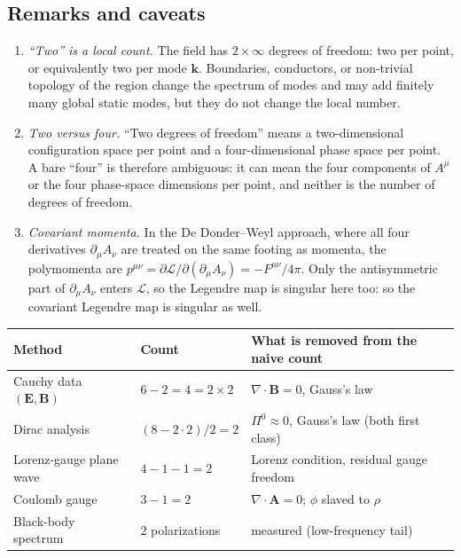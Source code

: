 \documentclass[11pt,a4paper]{book}
\begin{document}
\subsection{Remarks and caveats}

\begin{enumerate}
\item \emph{``Two'' is a local count.} The field has $2\times\infty$ degrees of freedom: two
per point, or equivalently two per mode $\mathbf k$. Boundaries, conductors, or non-trivial
topology of the region change the spectrum of modes and may add finitely many global static
modes, but they do not change the local number.
\item \emph{Two versus four.} ``Two degrees of freedom'' means a two-dimensional configuration
space per point and a four-dimensional phase space per point. A bare ``four'' is
therefore ambiguous: it can mean the four components of $A^\mu$ or the four phase-space dimensions
per point, and neither is the number of degrees of freedom.
\item \emph{Covariant momenta.} In the De Donder--Weyl approach, where all four derivatives
$\partial_\mu A_\nu$ are treated on the same footing as momenta, the polymomenta are
$p^{\mu\nu}=\partial\mathcal L/\partial(\partial_\mu A_\nu)=-F^{\mu\nu}/4\pi$. Only the antisymmetric
part of $\partial_\mu A_\nu$ enters $\mathcal L$, so the Legendre map is singular here too:
so the covariant Legendre map is singular as well.
\end{enumerate}

\begin{center}
\begin{tabular}{p{4.2cm}p{3.6cm}p{5.4cm}}
\hline
Method & Count & What is removed from the naive count \\
\hline
Cauchy data $(\mathbf E,\mathbf B)$ & $6-2=4=2\times2$ & $\nabla\cdot\mathbf B=0$, Gauss's law \\
Dirac analysis & $(8-2\cdot2)/2=2$ & $\Pi^0\approx0$, Gauss's law (both first class) \\
Lorenz-gauge plane wave & $4-1-1=2$ & Lorenz condition, residual gauge freedom \\
Coulomb gauge & $3-1=2$ & $\nabla\cdot\mathbf A=0$; $\phi$ slaved to $\rho$ \\
Black-body spectrum & $2$ polarizations & measured (low-frequency tail) \\
\hline
\end{tabular}
\end{center}
\end{document}
